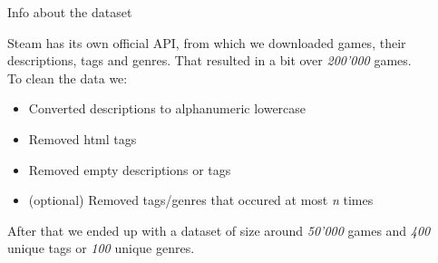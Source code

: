 \documentclass{beamer}
\begin{document}
\begin{frame}[t]{Info about the dataset}
 {
	Steam has its own official API, from which we downloaded games, their descriptions, tags and genres. That resulted in a bit over {\it 200'000} games. \\
	\vspace{2mm}
	To clean the data we:
	\begin{itemize}
		\item Converted descriptions to alphanumeric lowercase
		\item Removed html tags
		\item Removed empty descriptions or tags
		\item (optional) Removed tags/genres that occured at most {\it n} times
	\end{itemize}
	After that we ended up with a dataset of size around {\it 50'000} games and {\it 400} unique tags or {\it 100} unique genres.
}

\pause
{}
\end{frame}
\end{document}
